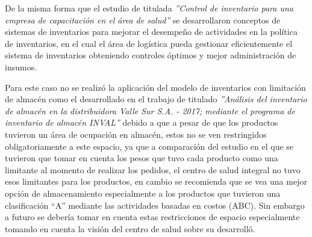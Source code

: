 \begin{discusiones}
De la misma forma que el estudio de \cite{caballero2007control} titulada \textsl{''Control de inventario para una empresa de capacitación en el área de salud''} se desarrollaron conceptos de sistemas de inventarios para mejorar el desempeño de actividades en la política de inventarios, en el cual el área de logística pueda gestionar eficientemente el sistema de inventarios obteniendo controles óptimos y mejor administración de insumos.

Para este caso no se realizó la aplicación del modelo de inventarios con limitación de almacén como el desarrollado en el trabajo de \cite{koper2017analisis} titulado \textsl{''Análisis del inventario de almacén en la distribuidora Valle Sur S.A. - 2017; mediante el programa de inventario de almacén INVAL''} debido a que a pesar de que los productos tuvieron un área de ocupación en almacén, estos no se ven restringidos obligatoriamente a este espacio, ya que a comparación del estudio en el que se tuvieron que tomar en cuenta los pesos que tuvo cada producto como una limitante al momento de realizar los pedidos, el centro de salud integral no tuvo esos limitantes para los productos, en cambio se recomienda que se vea una mejor opción de almacenamiento especialmente a los productos que tuvieron una clasificación ``A'' mediante las actividades basadas en costos (ABC). Sin embargo a futuro se debería tomar en cuenta estas restricciones de espacio especialmente tomando en cuenta la visión del centro de salud sobre su desarrolló.
	
\end{discusiones}